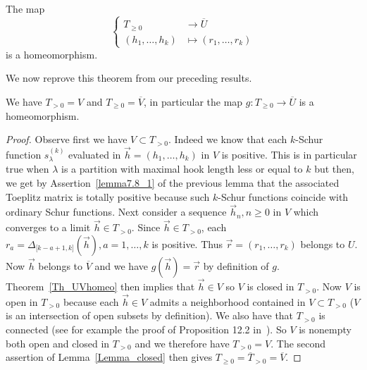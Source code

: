 \documentclass[ALCO,ThmDefs,Unicode,epreuves]{cedram}
\begin{document}
\begin{theorem}
The map%
\[
\left\{
\begin{aligned}%
T_{\geq0}&\longrightarrow\overline{U}\\
(h_{1},\ldots,h_{k})&\longmapsto(r_{1},\ldots,r_{k})
\end{aligned}
\right.
\]
is a homeomorphism.
\end{theorem}

We now reprove this theorem from our preceding results.

\begin{theorem}
\label{Th_RiRef}We have $T_{>0}=V$ and $T_{\geq0}=\overline{V}$, in particular
the map $g:T_{\geq0}\rightarrow\overline{U}$ is a homeomorphism$.$
\end{theorem}

\begin{proof}
Observe first we have $V\subset T_{>0}$. Indeed we know that each $k$-Schur
function $s_{\lambda}^{(k)}$ evaluated in $\vec{h}=(h_{1},\ldots,h_{k})$ in
$V$ is positive. This is in particular true when $\lambda$ is a partition with
maximal hook length less or equal to $k$ but then, we get by Assertion~\eqref{lemma7.8_1} of
the previous lemma that the associated Toeplitz matrix is totally positive
because such $k$-Schur functions coincide with ordinary Schur functions. Next
consider a sequence $\vec{h}_{n},n\geq0$ in $V$ which converges to a limit
$\vec{h}\in T_{>0}$. Since $\vec{h}\in T_{>0}$, each $r_{a}=\Delta_{\lbrack
k-a+1,k]}(\vec{h}),a=1,\ldots,k$ is positive. Thus $\vec{r}=(r_{1}%
,\ldots,r_{k})$ belongs to $U$. Now $\vec{h}$ belongs to $\overline{V}$ and we
have $g(\vec{h})=\vec{r}$ by definition of $g$. Theorem~\ref{Th_UVhomeo} then
implies that $\vec{h}\in V$ so $V$ is closed in $T_{>0}$. Now $V$ is open in
$T_{>0}$ because each $\vec{h}\in V$ admits a neighborhood contained in
$V\subset T_{>0}$ ($V$ is an intersection of open subsets by definition). We
also have that $T_{>0}$ is connected (see for example the proof of Proposition
12.2 in~\cite{Ri}). So $V$ is nonempty both open and closed in $T_{>0}$ and we
therefore have $T_{>0}=V$. The second assertion of Lemma~\ref{Lemma_closed}
then gives $T_{\geq0}=\overline{T}_{>0}=\overline{V}$.
\end{proof}

\end{document}
